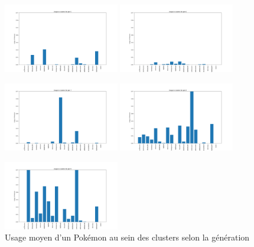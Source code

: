 \documentclass[a4paper,12pt]{article}
\begin{document}
\begin{figure}[!h]
    \vspace{1em}  %

    \includegraphics[width=0.45\textwidth]{Clustering/usage_gen/gen5.png}
    \includegraphics[width=0.45\textwidth]{Clustering/usage_gen/gen6.png}
    

    \vspace{1em}  %

    \includegraphics[width=0.45\textwidth]{Clustering/usage_gen/gen7.png}
    \includegraphics[width=0.45\textwidth]{Clustering/usage_gen/gen8.png}
    

    \vspace{1em}  %

    \includegraphics[width=0.45\textwidth]{Clustering/usage_gen/gen9.png}
    \caption{Usage moyen d'un Pokémon au sein des clusters selon la génération}
\end{figure}
\end{document}
